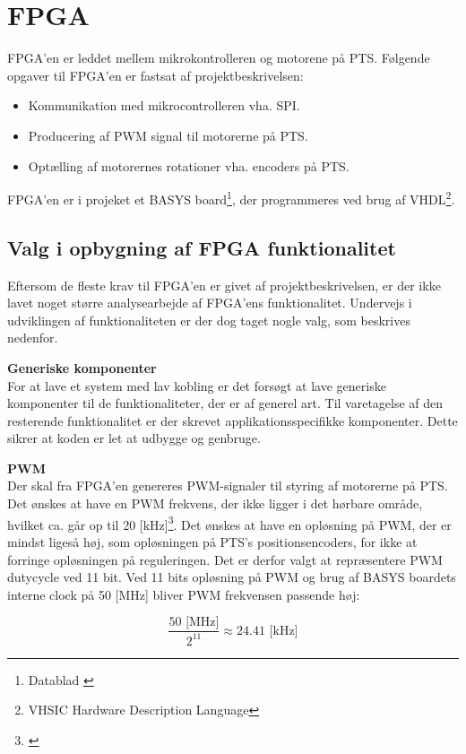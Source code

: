 \section{FPGA}
\label{sec:FPGA}
FPGA'en er leddet mellem mikrokontrolleren og motorene på PTS.
Følgende opgaver til FPGA'en er fastsat af projektbeskrivelsen:

\begin{itemize}
\itemsep1pt
	\item Kommunikation med mikrocontrolleren vha. SPI.
	\item Producering af PWM signal til motorerne på PTS.
	\item Optælling af motorernes rotationer vha. encoders på PTS.
\end{itemize}

FPGA'en er i projeket et BASYS board\footnote{Datablad \citep{basys2}}, der programmeres ved brug af VHDL\footnote{VHSIC Hardware Description Language}.

\subsection{Valg i opbygning af FPGA funktionalitet}
Eftersom de fleste krav til FPGA'en er givet af projektbeskrivelsen, er der ikke 
lavet noget større analysearbejde af FPGA'ens funktionalitet. Undervejs i 
udviklingen af funktionaliteten er der dog taget nogle valg, som beskrives nedenfor.

\textbf{Generiske komponenter}\\
For at lave et system med lav kobling er det forsøgt at lave 
generiske komponenter til de funktionaliteter, der er af generel art. 
Til varetagelse af den resterende funktionalitet er der skrevet applikationsspecifikke 
komponenter.
Dette sikrer at koden er let at udbygge og genbruge.

\textbf{PWM}\\
Der skal fra FPGA'en genereres PWM-signaler til styring af motorerne på PTS.
Det ønskes at have en PWM frekvens, der ikke ligger i det hørbare område, hvilket ca. går op til 20 [kHz]\footnote{\citep{Hearingrange}}. 
Det ønskes at have en opløsning på PWM, der er mindst ligeså høj, som 
opløsningen på PTS's positionsencoders, for ikke at forringe opløsningen på reguleringen. 
Det er derfor valgt at repræsentere PWM dutycycle ved 11 bit. 
Ved 11 bits opløsning på PWM og brug af BASYS boardets interne clock på 50 [MHz] bliver PWM frekvensen passende høj:

\begin{equation}
  \frac{50 \text{ [MHz]}}{2^{11}} \approx 24.41 \text{ [kHz]}
\end{equation}

